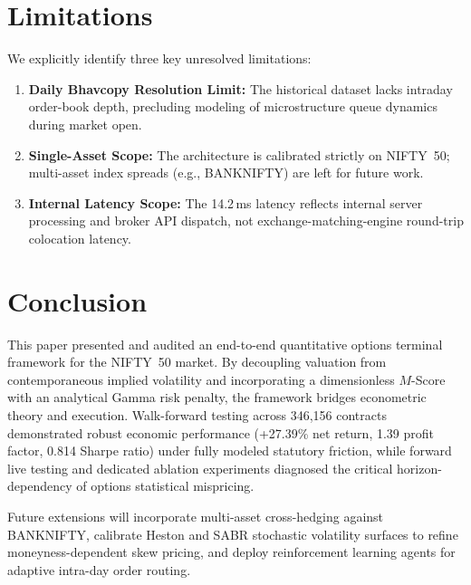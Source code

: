 \documentclass[journal]{IEEEtran}
\begin{document}
\section{Limitations}

We explicitly identify three key unresolved limitations:
\begin{enumerate}
    \item \textbf{Daily Bhavcopy Resolution Limit:} The historical dataset lacks intraday order-book depth, precluding modeling of microstructure queue dynamics during market open.
    \item \textbf{Single-Asset Scope:} The architecture is calibrated strictly on NIFTY~50; multi-asset index spreads (e.g., BANKNIFTY) are left for future work.
    \item \textbf{Internal Latency Scope:} The 14.2\,ms latency reflects internal server processing and broker API dispatch, not exchange-matching-engine round-trip colocation latency.
\end{enumerate}

\section{Conclusion}

This paper presented and audited an end-to-end quantitative options terminal framework for the NIFTY~50 market. By decoupling valuation from contemporaneous implied volatility and incorporating a dimensionless $M$-Score with an analytical Gamma risk penalty, the framework bridges econometric theory and execution. Walk-forward testing across 346{,}156 contracts demonstrated robust economic performance (+27.39\% net return, 1.39 profit factor, 0.814 Sharpe ratio) under fully modeled statutory friction, while forward live testing and dedicated ablation experiments diagnosed the critical horizon-dependency of options statistical mispricing.

Future extensions will incorporate multi-asset cross-hedging against BANKNIFTY, calibrate Heston and SABR stochastic volatility surfaces to refine moneyness-dependent skew pricing, and deploy reinforcement learning agents for adaptive intra-day order routing.
\end{document}

